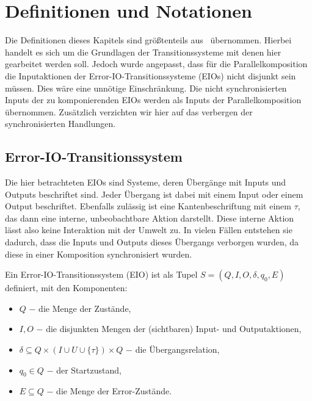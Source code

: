 \chapter{Definitionen und Notationen}

Die Definitionen dieses Kapitels sind größtenteils aus~\cite{Vogler2014EIO}
übernommen. Hierbei handelt es sich um die Grundlagen der Transitionssysteme mit denen
hier gearbeitet werden soll. Jedoch wurde angepasst, dass für die
Parallelkomposition die Inputaktionen der Error-IO-Transitionssysteme (EIOs) nicht disjunkt sein müssen. Dies
wäre eine unnötige Einschränkung. Die nicht synchronisierten Inputs der zu komponierenden EIOs werden
als Inputs der Parallelkomposition übernommen. Zusätzlich verzichten wir hier
auf das verbergen der synchronisierten Handlungen.

\section{Error-IO-Transitionssystem}
Die hier betrachteten EIOs sind Systeme, deren Übergänge mit Inputs und Outputs
beschriftet sind. Jeder Übergang ist dabei mit einem Input oder einem Output
beschriftet. Ebenfalls zulässig ist eine Kantenbeschriftung mit einem
$\tau$, das dann eine interne, unbeobachtbare Aktion darstellt. Diese interne
Aktion lässt also keine Interaktion mit
der Umwelt zu. In vielen Fällen entstehen sie dadurch, dass die Inputs und Outputs
dieses Übergangs verborgen wurden, da diese in einer Komposition synchronisiert
wurden.

\begin{Def}
  Ein Error-IO-Transitionssystem (EIO) ist
  als Tupel $S=(Q,I,O,\delta, q_0, E)$ definiert, mit den Komponenten:
  \begin{itemize}
    \item $Q$ $-$ die Menge der Zustände,
    \item $I,O$ $-$ die disjunkten Mengen der (sichtbaren) Input- und
      Outputaktionen,
    \item $\delta\subseteq Q\times (I\cup U\cup\{\tau\})\times Q$ $-$ die
      Übergangsrelation,
    \item $q_0\in Q$ $-$ der Startzustand,
    \item $E\subseteq Q$ $-$ die Menge der Error-Zustände.
  \end{itemize}
\end{Def}


